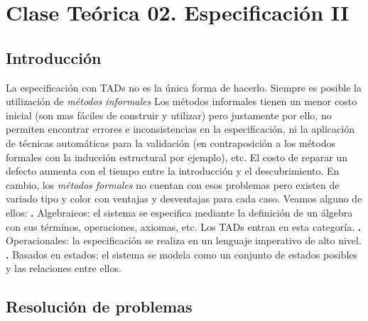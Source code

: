 \documentclass[10pt,a4paper]{article}
\begin{document}
\section{Clase Teórica 02. Especificación II}

\subsection{Introducción}

La especificación con TADs no es la única forma de hacerlo.
\newline
\newline
Siempre es posible la utilización de \textit{métodos informales}
\newline
\newline
Los métodos informales tienen un menor costo inicial (son mas fáciles de construir y utilizar) pero justamente por ello, no permiten encontrar errores e inconsistencias en la especificación, ni la aplicación de técnicas automáticas para la validación (en contraposición a los métodos formales con la inducción estructural por ejemplo), etc.
\newline
\newline
El costo de reparar un defecto aumenta con el tiempo entre la introducción y el descubrimiento.
\newline
\newline
En cambio, los \textit{métodos formales} no cuentan con esos problemas pero existen de variado tipo y color con ventajas y desventajas para cada caso. Veamos alguno de ellos:
\newline
\newline
\textbf{.} Algebraicos: el sistema se especifica mediante la definición de un álgebra con sus términos, operaciones, axiomas, etc. Los TADs entran en esta categoría.
\newline
\newline
\textbf{.} Operacionales: la especificación se realiza en un lenguaje imperativo de alto nivel.
\newline
\newline
\textbf{.} Basados en estados: el sistema se modela como un conjunto de estados posibles y las relaciones entre ellos. 

\subsection{Resolución de problemas}
\end{document}
